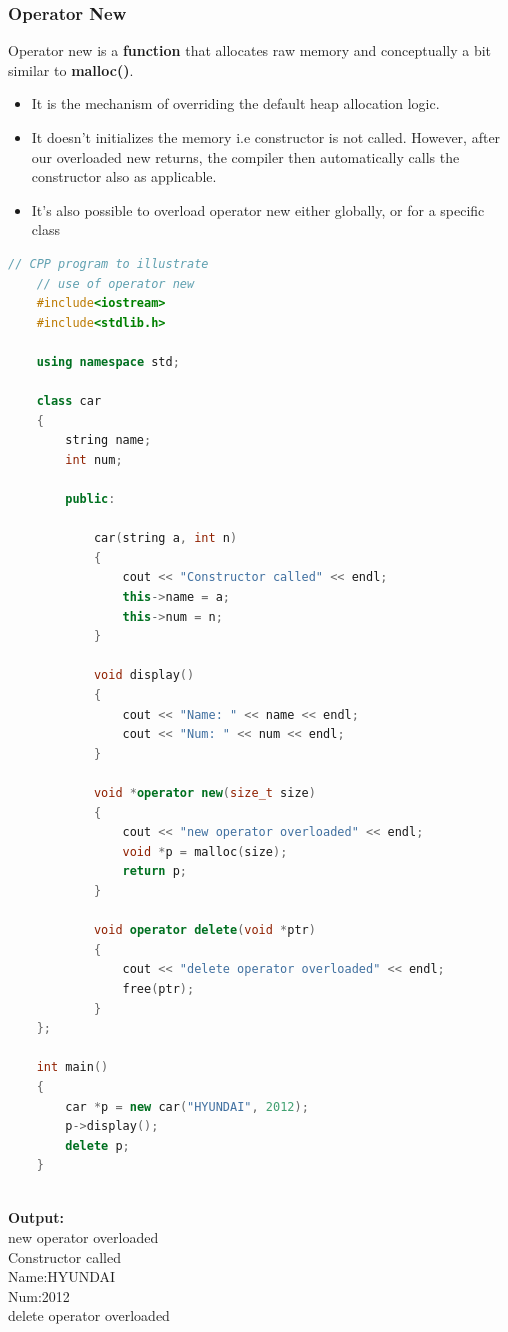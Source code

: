 \documentclass[12pt , a4paper]{article}
\newcommand{\hl}[1]{\colorbox{coolblack}{\color{cream}\textbf{#1}\color{black}}}
\begin{document}
	\subsubsection{Operator New}
	Operator new is a \textbf{function} that allocates raw memory and conceptually a bit similar to \hl{malloc()}.
	\begin{itemize}
		\item It is the mechanism of overriding the default heap allocation logic.\\
		\item It doesn’t initializes the memory i.e constructor is not called. However, after our overloaded new returns, the compiler then automatically calls the constructor also as applicable.\\
		\item It’s also possible to overload operator new either globally, or for a specific class\\
	\end{itemize}
	\begin{lstlisting}[language=C++]
	// CPP program to illustrate
	// use of operator new
	#include<iostream>
	#include<stdlib.h>
	
	using namespace std;
	
	class car
	{
		string name;
		int num;
	
		public:
	
			car(string a, int n)
			{
				cout << "Constructor called" << endl;
				this->name = a;
				this->num = n;
			}
	
			void display()
			{
				cout << "Name: " << name << endl;
				cout << "Num: " << num << endl;
			}
	
			void *operator new(size_t size)
			{
				cout << "new operator overloaded" << endl;
				void *p = malloc(size);
				return p;
			}
	
			void operator delete(void *ptr)
			{
				cout << "delete operator overloaded" << endl;
				free(ptr);
			}
	};
	
	int main()
	{
		car *p = new car("HYUNDAI", 2012);
		p->display();
		delete p;
	}
			
	\end{lstlisting}

	\begin{tcolorbox}
	\textbf{Output:}\\
	new operator overloaded\\
	Constructor called\\
	Name:HYUNDAI\\
	Num:2012\\
	delete operator overloaded\\
	\end{tcolorbox}
\end{document}
